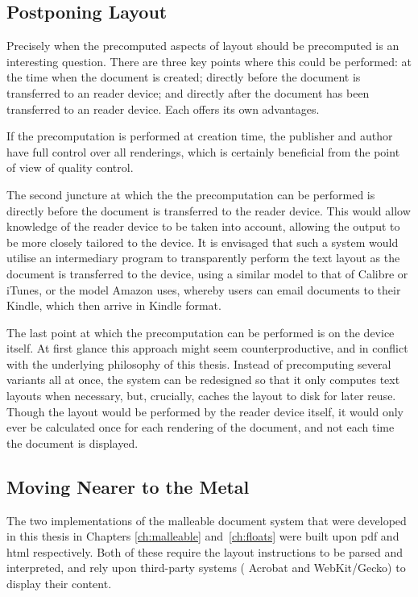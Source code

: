 \subsection{Postponing Layout}
\label{sec:postponing}
Precisely when the precomputed aspects of layout should be precomputed is an interesting question. There are three key points where this could be performed: at the time when the document is created; directly before the document is transferred to an \ebook{} reader device; and directly after the document has been transferred to an \ebook{} reader device. Each offers its own advantages.

If the precomputation is performed at creation time, the publisher and author have full control over all renderings, which is certainly beneficial from the point of view of quality control. 

The second juncture at which the the precomputation can be performed is directly before the document is transferred to the reader device. This would allow knowledge of the reader device to be taken into account, allowing the output to be more closely tailored to the device. It is envisaged that such a system would utilise an intermediary program to transparently perform the text layout as the document is transferred to the device, using a similar model to that of Calibre or iTunes, or the model Amazon uses, whereby users can email documents to their Kindle, which then arrive in Kindle format.

The last point at which the precomputation can be performed is on the device itself. At first glance this approach might seem counterproductive, and in conflict with the underlying philosophy of this thesis. Instead of precomputing several variants all at once, the system can be redesigned so that it only computes text layouts when necessary, but, crucially, caches the layout to disk for later reuse. Though the layout would be performed by the \ebook{} reader device itself, it would only ever be calculated once for each rendering of the document, and not each time the document is displayed.

\subsection{Moving Nearer to the Metal}
The two implementations of the malleable document system that were developed in this thesis in Chapters \ref{ch:malleable} and~\ref{ch:floats} were built upon \gls{pdf} and \gls{html} respectively. Both of these require the layout instructions to be parsed and interpreted, and rely upon third-party systems (\eg{} Acrobat and WebKit/Gecko) to display their content.

